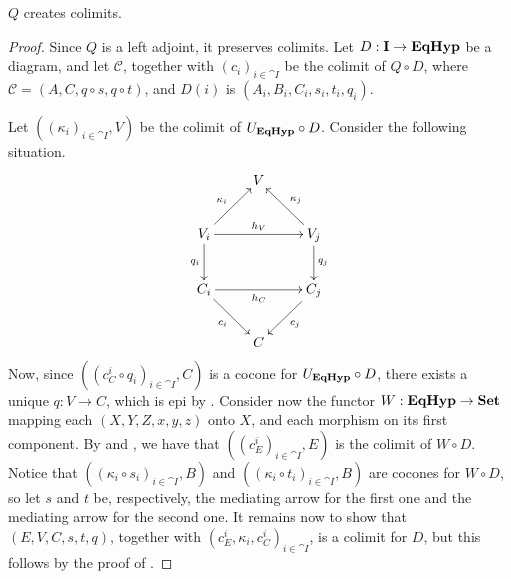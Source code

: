 \begin{proposition}\label{prop:quot_creat_colims}
    $Q$ creates colimits.
\end{proposition}


\begin{proof}
    Since $Q$ is a left adjoint, it preserves colimits.
	Let $D: \mathbf{I} \to \textbf{\textup{EqHyp}}$ be a diagram, and let $\mathcal{C}$, together with  $(c_i)_{i\in \cat I}$ be the colimit of $Q \circ D$, where $\mathcal{C} = (A, C, q\circ s, q\circ t)$, and $D(i)$ is $(A_i, B_i, C_i, s_i, t_i, q_i)$.
	\iffalse
	Let now $T: \EqHyp \to \Set$ be the functor mapping each graph with equivalence onto its second component, $T((X, Y, Z, x, y, z)) = Y$, and each morphims onto its second component.\fi
	Let $((\kappa_i)_{i\in \cat I}, V)$ be the colimit of $U_{\textbf{\textup{EqHyp}}} \circ D$.
	Consider the following situation.
	\[\xymatrix{
								  &  {V} &                             \\
		V_i \ar[ur]^{\kappa_i} \ar[rr]^{h_V} \ar[d]_{q_i} && V_j \ar[ul]_{\kappa_j} \ar[d]^{q_j}\\
		C_i \ar[dr]_{c_i}      \ar[rr]_{h_C}              &&C_j  \ar[dl]^{c_j}                  \\
								  &  {C} &
	}\]
	Now, since $((c^i_C \circ q_i)_{i \in \cat I}, C)$ is a cocone for $U_{\textbf{\textup{EqHyp}}} \circ D$, there exists a unique $q: V \to C$, which is epi by .
	Consider now the functor $W: \textbf{\textup{EqHyp}} \to \mathbf{Set}$ mapping each $(X, Y, Z, x, y, z)$ onto $X$, and each morphism on its first component.
	By  and , we have that $((c_E^i)_{i \in \cat I}, E)$ is the colimit of $W \circ D$.
	Notice that $((\kappa_i \circ s_i)_{i \in \cat{I}}, B)$ and $((\kappa_i \circ t_i)_{i \in \cat I}, B)$ are cocones for $W \circ D$, so let $s$ and $t$ be, respectively, the mediating arrow for the first one and the mediating arrow for the second one. It remains now to show that $(E, V, C, s, t, q)$, together with $(c_E^i, \kappa_i, c_C^i)_{i \in \cat I}$, is a colimit for $D$, but this follows by the proof of .
\end{proof}

